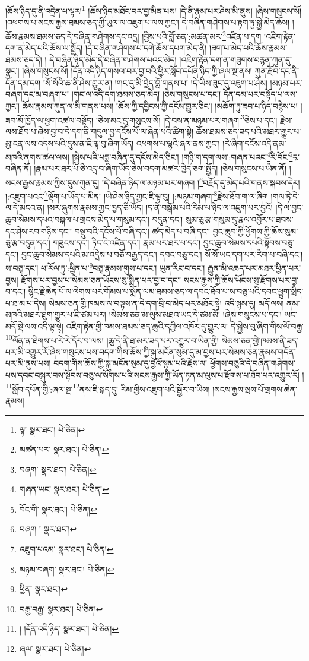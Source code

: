 །ཆོས་ཉིད་དུ་ནི་འདྲེན་པ་ལྟར།\footnote{ལྟ།  སྣར་ཐང་།  པེ་ཅིན། } །ཆོས་ཉིད་མཐོང་བར་བྱ་མིན་པས། །དེ་ནི་རྣམ་པར་ཤེས་མི་ནུས། །ཞེས་གསུངས་སོ། །འཕགས་པ་སངས་རྒྱས་ཐམས་ཅད་ཀྱི་ཡུལ་ལ་འཇུག་པ་ལས་ཀྱང་། དེ་བཞིན་གཤེགས་པ་རྟག་ཏུ་སྐྱེ་མེད་ཆོས། །ཆོས་རྣམས་ཐམས་ཅད་དེ་བཞིན་གཤེགས་དང་འདྲ། །བྱིས་པའི་བློ་ཅན་:མཚན་མར་\footnote{མཚན་པར་  སྣར་ཐང་།  པེ་ཅིན། }འཛིན་པ་དག །འཇིག་རྟེན་དག་ན་མེད་པའི་ཆོས་ལ་སྤྱོད། །དེ་བཞིན་གཤེགས་པ་དགེ་ཆོས་དཔག་མེད་ནི། །ཟག་པ་མེད་པའི་ཆོས་རྣམས་ཐམས་ཅད་དེ། །
དེ་བཞིན་ཉིད་མེད་དེ་བཞིན་གཤེགས་པའང་མེད། །འཇིག་རྟེན་དག་ན་གཟུགས་བརྙན་ཀུན་དུ་སྣང་། །ཞེས་གསུངས་སོ། །དོན་འདི་ཉིད་གསལ་བར་བྱ་བའི་ཕྱིར་སློབ་དཔོན་ཉིད་ཀྱི་ཞལ་སྔ་ནས། ཀུན་རྫོབ་དང་ནི་དོན་དམ་དག །སོ་སོའི་ཆ་ནི་ཤེས་གྱུར་ན། །གང་དུ་མི་བྱེད་བློ་གནས་པ། །དེ་ཡིས་ཟུང་དུ་འཇུག་པ་ཤེས། །མཉམ་པར་བཞག་དང་མ་བཞག་པ། །གང་ལ་འདི་དག་ཐམས་ཅད་མེད། །ཅེས་གསུངས་པ་དང་། དོན་དམ་པར་བསྟོད་པ་ལས་ཀྱང་། ཆོས་རྣམས་ཀུན་ལ་མི་གནས་པས། །ཆོས་ཀྱི་དབྱིངས་ཀྱི་དངོས་གྱུར་ཅིང་། །མཆོག་ཏུ་ཟབ་པ་ཉིད་བརྙེས་པ། །ཟབ་མོ་ཁྱོད་ལ་ཕྱག་འཚལ་བསྟོད། །ཅེས་མང་དུ་གསུངས་སོ། །དེ་བས་ན་མཉམ་པར་གཞག་\footnote{བཞག་  སྣར་ཐང་།  པེ་ཅིན། }ཅེས་པ་དང་། རྗེས་ལས་ཐོབ་པ་ཞེས་བྱ་བ་དེ་དག་ནི་གདུལ་བྱ་དངོས་པོ་ལ་ཞེན་པའི་ཚིག་སྟེ། ཆོས་ཐམས་ཅད་ཟད་པའི་མཐར་གྱུར་པ་མྱ་ངན་ལས་འདས་པའི་དུས་ན་ཇི་ལྟ་བུ་ཞིག་ཡོད། འཕགས་པ་ལྷའི་ཞལ་ནས་ཀྱང་། །རེ་ཞིག་དངོས་འདི་ནམ་མཁའི་ནགས་ཚལ་ལས། །སྐྱེས་པའི་པདྨ་བཞིན་དུ་དངོས་མེད་ཅིང་། །གཉི་ག་དག་ལས་:གཞན་པའང་\footnote{གཞན་ཡང་  སྣར་ཐང་།  པེ་ཅིན། }རི་བོང་\footnote{བོང་གི་  སྣར་ཐང་།  པེ་ཅིན། }རྭ་བཞིན་ནོ། །རྣམ་པར་ཐར་པ་ཅི་འདྲ་བ་ཞིག་ཡོད་ཅེས་བདག་མཚར་ཁྱེད་ཅག་སྤྱོད། །ཅེས་གསུངས་པ་ཡིན་ནོ། །སངས་རྒྱས་རྣམས་ཀྱིས་དུས་ཀུན་དུ། །དེ་བཞིན་ཉིད་ལ་མཉམ་པར་གཞག །\footnote{བཞག །  སྣར་ཐང་། }བརྗོད་དུ་མེད་པའི་གནས་སྐབས་དེར། །:འཇུག་པའང་\footnote{འཇུག་པའམ་  སྣར་ཐང་།  པེ་ཅིན། }ལྡོག་པ་ཡོད་པ་མིན། །ཡེ་ཤེས་ཉིད་ཀྱང་ཇི་ལྟ་བུ། །:མཉམ་གཞག་\footnote{མཉམ་བཞག་  སྣར་ཐང་།  པེ་ཅིན། }རྗེས་ཐོབ་ག་ལ་ཞིག །གལ་ཏེ་དེ་ལ་དེ་མངའ་ན། །སར་ཞུགས་རྣམས་ཀྱང་ཁྱད་ཅི་ཡོད། །ད་ནི་བསྒོམ་པའི་རིམ་པ་ཉིད་ལ་འཇུག་པར་བྱའོ། །དེ་ལ་བྱང་ཆུབ་སེམས་དཔའ་བསྐལ་པ་གྲངས་མེད་པ་གསུམ་དང་། བདུན་དང་། སུམ་ཅུ་རྩ་གསུམ་དུ་རྣལ་འབྱོར་པ་ཐབས་དང་ཤེས་རབ་གཉིས་དང་། བསྡུ་བའི་དངོས་པོ་བཞི་དང་། ཚད་མེད་པ་བཞི་དང་། བྱང་ཆུབ་ཀྱི་ཕྱོགས་ཀྱི་ཆོས་སུམ་ཅུ་རྩ་བདུན་དང་། གཟུངས་དང་། ཏིང་ངེ་འཛིན་དང་། རྣམ་པར་ཐར་པ་དང་། བྱང་ཆུབ་སེམས་དཔའི་སྟོབས་བཅུ་དང་། བྱང་ཆུབ་སེམས་དཔའི་མ་འདྲེས་པ་བཅོ་བརྒྱད་དང་། དབང་བཅུ་དང་། སོ་སོ་ཡང་དག་པར་རིག་པ་བཞི་དང་། ས་བཅུ་དང་། ཕ་རོལ་ཏུ་:ཕྱིན་པ་\footnote{ཕྱིན་  སྣར་ཐང་། }བཅུ་རྣམས་གུས་པ་དང་། ཡུན་རིང་བ་དང་། རྒྱུན་མི་འཆད་པར་མཐར་ཕྱིན་པར་བྱས། རྫོགས་པར་བྱས་པ་སེམས་ཅན་ཡོངས་སུ་སྨིན་པར་བྱ་བ་དང་། སངས་རྒྱས་ཀྱི་ཆོས་ཡོངས་སུ་རྫོགས་པར་བྱ་བ་དང་། སྙིང་རྗེ་ཆེན་པོ་ལ་ལེགས་པར་གོམས་པ་སྨོན་ལམ་ཐམས་ཅད་ལ་དབང་ཐོབ་པ་ས་བཅུ་པའི་དབང་ཕྱུག་སྲིད་པ་ཐ་མ་པ་དེས། སེམས་ཅན་གྱི་ཁམས་ལ་བལྟས་ན་དེ་དག་བྲི་བ་མེད་པར་མཐོང་སྟེ། འདི་སྙམ་དུ། མདོ་ལས། ནམ་མཁའི་མཐར་ཐུག་གྱུར་པ་ཇི་ཙམ་པར། །སེམས་ཅན་མ་ལུས་མཐའ་ཡང་དེ་ཙམ་མོ། །ཞེས་གསུངས་པ་དང་། ཡང་མདོ་སྡེ་ལས་འདི་ལྟ་སྟེ། འཇིག་རྟེན་གྱི་ཁམས་ཐམས་ཅད་ཆུའི་དཀྱིལ་འཁོར་དུ་གྱུར་ལ། དེ་སྐྱེས་བུ་ཞིག་གིས་ལོ་བརྒྱ་\footnote{བརྒྱ་བརྒྱ་  སྣར་ཐང་།  པེ་ཅིན། }ལོན་ན་ཐིགས་པ་རེ་རེ་དོར་བ་ལས། །ཆུ་དེ་ནི་ཐ་མར་ཟད་པར་འགྱུར་བ་ཡིན་གྱི། སེམས་ཅན་གྱི་ཁམས་ནི་ཟད་པར་མི་འགྱུར་རོ་ཞེས་གསུངས་པས་བདག་གིས་ཆོས་ཀྱི་སྐུ་མངོན་སུམ་དུ་མ་བྱས་པར་སེམས་ཅན་རྣམས་གདོན་པར་མི་ནུས་པས། བདག་གིས་ཆོས་ཀྱི་སྐུ་མངོན་སུམ་དུ་བྱའོ་སྙམ་པའི་རྗེས་ལ། ཕྱོགས་བཅུའི་དེ་བཞིན་གཤེགས་པས་དབང་བསྐུར་བས་སྟོབས་བཅུ་ལ་སོགས་པའི་སངས་རྒྱས་ཀྱི་ཡོན་ཏན་མ་ལུས་པ་རྫོགས་པ་ཐོབ་པར་འགྱུར་རོ། །\footnote{། །དོན་འདི་ཉིད་  སྣར་ཐང་།  པེ་ཅིན། }སློབ་དཔོན་གྱི་:ཞལ་སྔ་\footnote{ཞལ་  སྣར་ཐང་།  པེ་ཅིན། }ནས་ཇི་སྐད་དུ། རིམ་གྱིས་འཇུག་པའི་སྦྱོར་བ་ཡིས། །སངས་རྒྱས་སྲས་པོ་གྲགས་ཆེན་རྣམས། 